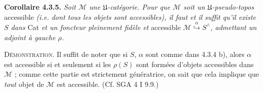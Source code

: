 \noindent\textbf{Corollaire 4.3.5.} \textit{Soit $\mathcal M$ une $\mathfrak U$-catégorie. Pour que $\mathcal M$ soit un $\mathfrak U$-pseudo-topos} accessible \textit{(i.e. dont tous les objets sont accessibles), il faut et il suffit qu'il existe $S$ dans} Cat \textit{et un foncteur pleinement fidèle et} accessible $\mathcal M\overset{\alpha}{\hookrightarrow}S^\wedge$\textit{, admettant un adjoint à gauche $\rho$.}

\noindent{}\textsc{Démonstration}. Il suffit de noter que si $S$, $\alpha$ sont comme dans 4.3.4 b), alors $\alpha$ est accessible si et seulement si les $\rho(S)$ sont formées d'objets accessibles dans $\mathcal M$ ; comme cette partie est strictement génératrice, on sait que cela implique que \textit{tout} objet de $\mathcal M$ est accessible. (Cf. SGA 4 I 9.9.)

